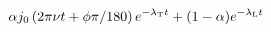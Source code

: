 \documentclass[12pt]{article}
\begin{document}
\begin{displaymath}
\alpha j_0\left(2\pi\nu t + \phi\pi/180\right) e^{-\lambda_{\rm T} t} + (1-\alpha) e^{-\lambda_{\rm L} t}
\end{displaymath}
\end{document}
